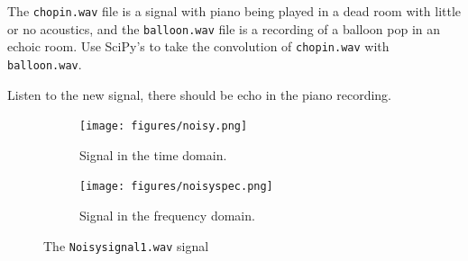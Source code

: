 \begin{problem}
The \texttt{chopin.wav} file is a signal with piano being played in a dead room with little or no acoustics, and the \texttt{balloon.wav} file is a recording of a balloon pop in an echoic room. 
Use SciPy's  to take the convolution of \texttt{chopin.wav} with \texttt{balloon.wav}.

Listen to the new signal, there should be echo in the piano recording. 

\end{problem}

\begin{figure}[H]
\captionsetup[subfigure]{justification=centering}
\centering
\begin{subfigure}{.5\textwidth}
    \centering
    \texttt{[image: figures/noisy.png]}
    \caption{Signal in the time domain.}
    \label{fig:noisysignal}
\end{subfigure}%
\begin{subfigure}{.5\textwidth}
    \centering
    \texttt{[image: figures/noisyspec.png]}
    \caption{Signal in the frequency domain.}
    \label{fig:noisyspec}
\end{subfigure}
\caption{The \texttt{Noisysignal1.wav} signal}
\end{figure}

